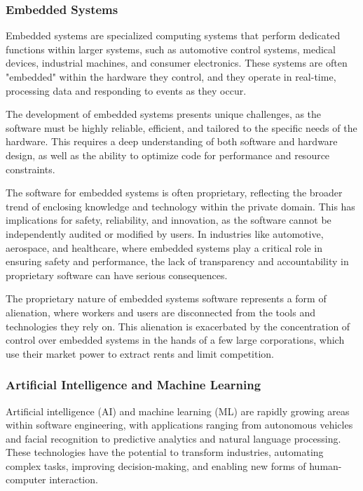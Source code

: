\begin{refsection}
\begin{multicols}{2}
{\subsubsection{Embedded Systems}

Embedded systems are specialized computing systems that perform dedicated functions within larger systems, such as automotive control systems, medical devices, industrial machines, and consumer electronics. These systems are often "embedded" within the hardware they control, and they operate in real-time, processing data and responding to events as they occur.

The development of embedded systems presents unique challenges, as the software must be highly reliable, efficient, and tailored to the specific needs of the hardware. This requires a deep understanding of both software and hardware design, as well as the ability to optimize code for performance and resource constraints.

The software for embedded systems is often proprietary, reflecting the broader trend of enclosing knowledge and technology within the private domain. This has implications for safety, reliability, and innovation, as the software cannot be independently audited or modified by users. In industries like automotive, aerospace, and healthcare, where embedded systems play a critical role in ensuring safety and performance, the lack of transparency and accountability in proprietary software can have serious consequences.

The proprietary nature of embedded systems software represents a form of alienation, where workers and users are disconnected from the tools and technologies they rely on. This alienation is exacerbated by the concentration of control over embedded systems in the hands of a few large corporations, which use their market power to extract rents and limit competition.

\subsubsection{Artificial Intelligence and Machine Learning}

Artificial intelligence (AI) and machine learning (ML) are rapidly growing areas within software engineering, with applications ranging from autonomous vehicles and facial recognition to predictive analytics and natural language processing. These technologies have the potential to transform industries, automating complex tasks, improving decision-making, and enabling new forms of human-computer interaction.

}
\end{multicols}
\end{refsection}
